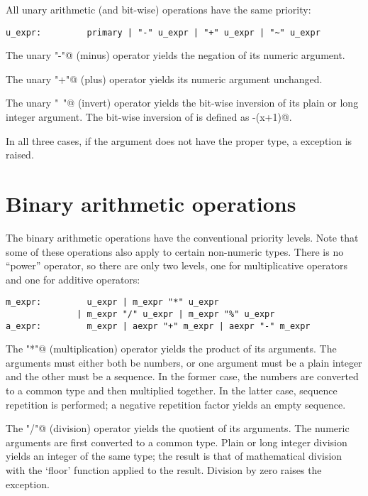 All unary arithmetic (and bit-wise) operations have the same priority:

\begin{verbatim}
u_expr:         primary | "-" u_expr | "+" u_expr | "~" u_expr
\end{verbatim}

The unary \verb@"-"@ (minus) operator yields the negation of its
numeric argument.

The unary \verb@"+"@ (plus) operator yields its numeric argument
unchanged.

The unary \verb@"~"@ (invert) operator yields the bit-wise inversion
of its plain or long integer argument.  The bit-wise inversion of
\verb@x@ is defined as \verb@-(x+1)@.

In all three cases, if the argument does not have the proper type,
a \verb@TypeError@ exception is raised.

\section{Binary arithmetic operations}

The binary arithmetic operations have the conventional priority
levels.  Note that some of these operations also apply to certain
non-numeric types.  There is no ``power'' operator, so there are only
two levels, one for multiplicative operators and one for additive
operators:

\begin{verbatim}
m_expr:         u_expr | m_expr "*" u_expr
              | m_expr "/" u_expr | m_expr "%" u_expr
a_expr:         m_expr | aexpr "+" m_expr | aexpr "-" m_expr
\end{verbatim}

The \verb@"*"@ (multiplication) operator yields the product of its
arguments.  The arguments must either both be numbers, or one argument
must be a plain integer and the other must be a sequence.  In the
former case, the numbers are converted to a common type and then
multiplied together.  In the latter case, sequence repetition is
performed; a negative repetition factor yields an empty sequence.

The \verb@"/"@ (division) operator yields the quotient of its
arguments.  The numeric arguments are first converted to a common
type.  Plain or long integer division yields an integer of the same
type; the result is that of mathematical division with the `floor'
function applied to the result.  Division by zero raises the
\verb@ZeroDivisionError@ exception.

